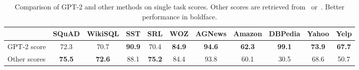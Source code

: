 \begin{table}[t]
\centering
    \begin{adjustbox}{max width=\textwidth}
    \begin{tabular}{l*{10}{c}}
    \toprule
    & SQuAD & WikiSQL & SST & SRL & WOZ & AGNews & Amazon & DBPedia & Yahoo & Yelp \\
    \midrule
    GPT-2 score & 72.3 & 70.7 & \textbf{90.9} & 70.4 & \textbf{84.9} & \textbf{94.6} & \textbf{62.3} & \textbf{99.1} & \textbf{73.9} & \textbf{67.7} \\
    Other scores & \textbf{75.5} & \textbf{72.6} & 88.1 &  \textbf{75.2} & 84.4 & 93.8 & 60.1 & 30.5 & 68.6 & 50.7 \\
    \bottomrule
    \end{tabular}
    \end{adjustbox}
    \caption{Comparison of GPT-2 and other methods on single task scores. Other scores are retrieved from~\cite{McCann2018decaNLP} or~\cite{d2019episodic}. Better performance in boldface.}
\label{tab:single_task}
\end{table}